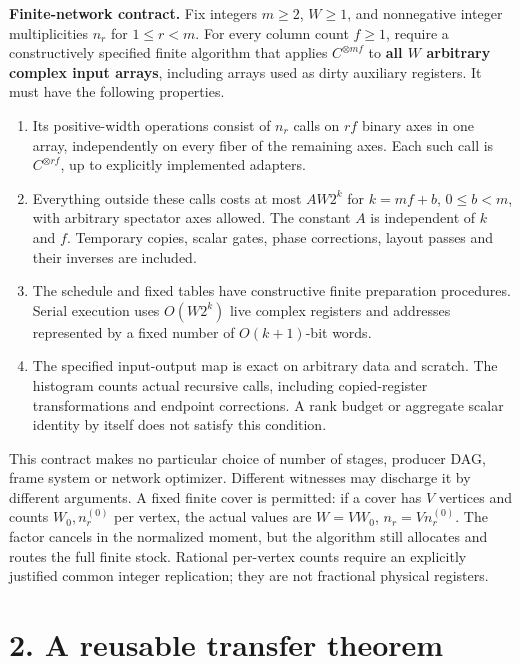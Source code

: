 \documentclass[
  11pt,
]{article}
\providecommand{\tightlist}{%
  \setlength{\itemsep}{0pt}\setlength{\parskip}{0pt}}
\begin{document}
\textbf{Finite-network contract.} Fix integers \(m\ge2\), \(W\ge1\), and
nonnegative integer multiplicities \(n_r\) for \(1\le r<m\). For every
column count \(f\ge1\), require a constructively specified finite
algorithm that applies \(C^{\otimes mf}\) to \textbf{all \(W\) arbitrary
complex input arrays}, including arrays used as dirty auxiliary
registers. It must have the following properties.

\begin{enumerate}
\def\labelenumi{\arabic{enumi}.}
\tightlist
\item
  Its positive-width operations consist of \(n_r\) calls on \(rf\)
  binary axes in one array, independently on every fiber of the
  remaining axes. Each such call is \(C^{\otimes rf}\), up to explicitly
  implemented adapters.
\item
  Everything outside these calls costs at most \(A W2^k\) for
  \(k=mf+b\), \(0\le b<m\), with arbitrary spectator axes allowed. The
  constant \(A\) is independent of \(k\) and \(f\). Temporary copies,
  scalar gates, phase corrections, layout passes and their inverses are
  included.
\item
  The schedule and fixed tables have constructive finite preparation
  procedures. Serial execution uses \(O(W2^k)\) live complex registers
  and addresses represented by a fixed number of \(O(k+1)\)-bit words.
\item
  The specified input-output map is exact on arbitrary data and scratch.
  The histogram counts actual recursive calls, including copied-register
  transformations and endpoint corrections. A rank budget or aggregate
  scalar identity by itself does not satisfy this condition.
\end{enumerate}

This contract makes no particular choice of number of stages, producer
DAG, frame system or network optimizer. Different witnesses may
discharge it by different arguments. A fixed finite cover is permitted:
if a cover has \(V\) vertices and counts \(W_0,n_r^{(0)}\) per vertex,
the actual values are \(W=VW_0\), \(n_r=Vn_r^{(0)}\). The factor cancels
in the normalized moment, but the algorithm still allocates and routes
the full finite stock. Rational per-vertex counts require an explicitly
justified common integer replication; they are not fractional physical
registers.

\section{2. A reusable transfer
theorem}\label{a-reusable-transfer-theorem}
\end{document}
